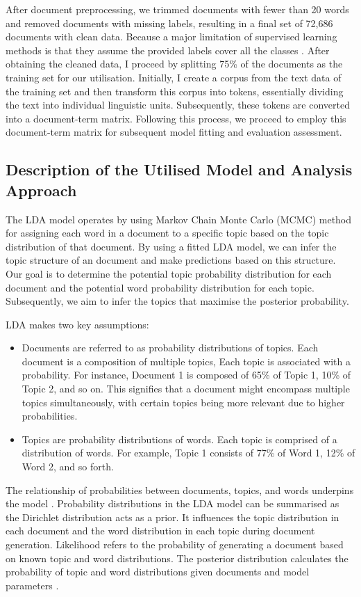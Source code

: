 \documentclass[12pt,twoside]{article}
\begin{document}
After document preprocessing, we trimmed documents with fewer than 20 words and removed documents with missing labels, resulting in a final set of 72,686 documents with clean data. Because a major limitation of supervised learning methods is that they assume the provided labels cover all the classes \cite{Kang2014}. After obtaining the cleaned data, I proceed by splitting 75\% of the documents as the training set for our utilisation. Initially, I create a corpus from the text data of the training set and then transform this corpus into tokens, essentially dividing the text into individual linguistic units. Subsequently, these tokens are converted into a document-term matrix. Following this process, we proceed to employ this document-term matrix for subsequent model fitting and evaluation assessment.

\subsection{Description of the Utilised Model and Analysis Approach}
The LDA model operates by using Markov Chain Monte Carlo (MCMC) method for assigning each word in a document to a specific topic based on the topic distribution of that document. By using a fitted LDA model, we can infer the topic structure of an document and make predictions based on this structure. Our goal is to determine the potential topic probability distribution for each document and the potential word probability distribution for each topic. Subsequently, we aim to infer the topics that maximise the posterior probability.

LDA makes two key assumptions:
\begin{itemize}
\item Documents are referred to as probability distributions of topics. Each document is a composition of multiple topics, Each topic is associated with a probability. For instance, Document 1 is composed of 65\% of Topic 1, 10\% of Topic 2, and so on. This signifies that a document might encompass multiple topics simultaneously, with certain topics being more relevant due to higher probabilities. 

\item Topics are probability distributions of words. Each topic is comprised of a distribution of words. For example, Topic 1 consists of 77\% of Word 1, 12\% of Word 2, and so forth. 
\end{itemize}
The relationship of probabilities between documents, topics, and words underpins the model \cite{Seth2021}. Probability distributions in the LDA model can be summarised as the Dirichlet distribution acts as a prior. It influences the topic distribution in each document and the word distribution in each topic during document generation. Likelihood refers to the probability of generating a document based on known topic and word distributions. The posterior distribution calculates the probability of topic and word distributions given documents and model parameters \cite{Naushan2020}. \\\\
\end{document}
